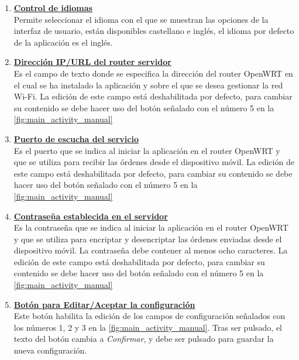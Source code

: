 \documentclass[12pt]{article}
\begin{document}
        \begin{enumerate}

            \item \textbf{\underline{Control de idiomas}} \\
            Permite seleccionar el idioma con el que se muestran las opciones de la interfaz de usuario, están disponibles castellano e inglés, el idioma por defecto de la aplicación es el inglés.

            \item \textbf{\underline{Dirección IP/URL del router servidor}} \\
            Es el campo de texto donde se especifica la dirección del router OpenWRT en el cual se ha instalado la aplicación y sobre el que se desea gestionar la red Wi-Fi. La edición de este campo está deshabilitada por defecto, para cambiar su contenido se debe hacer uso del botón señalado con el número 5 en la \ref{fig:main_activity_manual}

            \item \textbf{\underline{Puerto de escucha del servicio}} \\
            Es el puerto que se indica al iniciar la aplicación en el router OpenWRT y que se utiliza para recibir las órdenes desde el dispositivo móvil. La edición de este campo está deshabilitada por defecto, para cambiar su contenido se debe hacer uso del botón señalado con el número 5 en la \ref{fig:main_activity_manual}

            \item \textbf{\underline{Contraseña establecida en el servidor}} \\
            Es la contraseña que se indica al iniciar la aplicación en el router OpenWRT y que se utiliza para encriptar y desencriptar las órdenes enviadas desde el dispositivo móvil. La contraseña debe contener al menos ocho caracteres. La edición de este campo está deshabilitada por defecto, para cambiar su contenido se debe hacer uso del botón señalado con el número 5 en la \ref{fig:main_activity_manual}

            \item \textbf{\underline{Botón para Editar/Aceptar la configuración}} \\
            Este botón habilita la edición de los campos de configuración señalados con los números 1, 2 y 3 en la \ref{fig:main_activity_manual}. Tras ser pulsado, el texto del botón cambia a \textit{Confirmar}, y debe ser pulsado para guardar la nueva configuración.


\end{enumerate}
\end{document}
